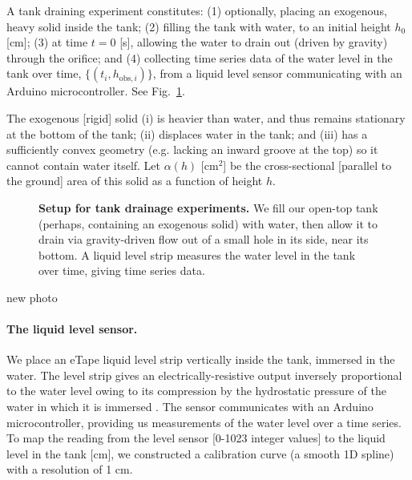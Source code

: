 \documentclass[openacc]{rsproca_new}%
\begin{document}
A tank draining experiment constitutes: 
(1) optionally, placing an exogenous, heavy solid inside the tank; 
(2) filling the tank with water, to an initial height $h_0$ [cm]; 
(3) at time $t=0$ [s], allowing the water to drain out (driven by gravity) through the orifice; and 
(4) collecting time series data of the water level in the tank over time, $\{(t_i, h_{\text{obs}, i}) \}$, from a liquid level sensor communicating with an Arduino microcontroller. See Fig.~\ref{fig:photo_of_tank}.

The exogenous [rigid] solid (i) is heavier than water, and thus remains stationary at the bottom of the tank; (ii) displaces water in the tank; and (iii) has a sufficiently convex geometry (e.g. lacking an inward groove at the top) so it cannot contain water itself. 
Let $\alpha(h)$ [cm$^2$] be the cross-sectional [parallel to the ground] area of this solid as a function of height $h$.

\begin{figure}[h!]
\begin{center}
	\caption{\textbf{Setup for tank drainage experiments.}
	We fill our open-top tank (perhaps, containing an exogenous solid) with water, then allow it to drain via gravity-driven flow out of a small hole in its side, near its bottom. A liquid level strip measures the water level in the tank over time, giving time series data.
	}
	\label{fig:photo_of_tank}
\end{center}
\end{figure}

{\color{red} new photo}

\paragraph{The liquid level sensor.}
We place an eTape\texttrademark\xspace liquid level strip vertically inside the tank, immersed in the water. 
The level strip gives an electrically-resistive output inversely proportional to the water level owing to its compression by the hydrostatic pressure of the water in which it is immersed \cite{eTape}.
The sensor communicates with an Arduino microcontroller, providing us measurements of the water level over a time series. 
To map the reading from the level sensor [0-1023 integer values] to the liquid level in the tank [cm], we constructed a calibration curve (a smooth 1D spline) with a resolution of 1 cm.
\end{document}
